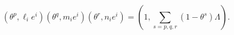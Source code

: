 \begin{equation}
(\theta^p,\ell_ie^i)(\theta^q,m_ie^i) (\theta^r,n_ie^i)
= (1,\sum_{s=p,q,r}(1-\theta^s)\Lambda) .
\label{selection}
\end{equation}

